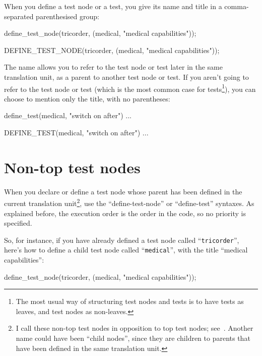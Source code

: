 \documentclass[twoside, a4paper, article]{memoir}
\begin{document}
When you define a test node or a test, you give its name and title in a
comma-separated parenthesised group:
\begin{cpplisting}
define_test_node(tricorder,
                 (medical, "medical capabilities"));
\end{cpplisting}

\begin{cpplisting}
DEFINE_TEST_NODE(tricorder,
                 (medical, "medical capabilities"));
\end{cpplisting}

The name allows you to refer to the test node or test later in the same
translation unit, as a parent to another test node or test.  If you aren't
going to refer to the test node or test (which is the most common case for
tests\footnote{The most usual way of structuring test nodes and tests is to
  have tests as leaves, and test nodes as non-leaves.}), you can choose to
mention only the title, with no parentheses:
\begin{cpplisting}
define_test(medical, "switch on after") {
  ...
}
\end{cpplisting}

\begin{cpplisting}
DEFINE_TEST(medical, "switch on after")
{
  ...
}
\end{cpplisting}


\section{Non-top test nodes}
\label{sec:non-top-test-nodes}

When you declare or define a test node whose parent has been defined in the
current translation unit\footnote{I call these non-top test nodes in opposition
  to top test nodes; see~.  Another name could have
  been ``child nodes'', since they are children to parents that have been
  defined in the same translation unit.}, use the ``define-test-node'' or
``define-test'' syntaxes.  As explained before, the execution order is the
order in the code, so no priority is specified.

So, for instance, if you have already defined a test node called
``\texttt{tricorder}'', here's how to define a child test node called
``\texttt{medical}'', with the title ``medical capabilities'':
\begin{cpplisting}
define_test_node(tricorder,
                 (medical, "medical capabilities"));
\end{cpplisting}
\end{document}
